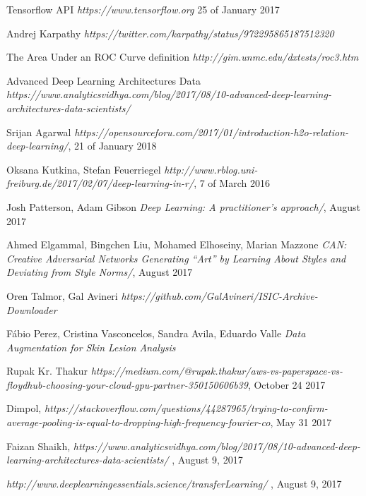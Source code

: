 \documentclass[titlepage,openright,twoside,a4paper,
final,12pt,english]{book}
\begin{document}
\begin{thebibliography}{9}
  Tensorflow API
{\em https://www.tensorflow.org} 25 of January 2017

  Andrej Karpathy 
{\em https://twitter.com/karpathy/status/972295865187512320}

 The Area Under an ROC Curve definition 
{\em http://gim.unmc.edu/dxtests/roc3.htm}

 Advanced Deep Learning Architectures Data
{\em https://www.analyticsvidhya.com/blog/2017/08/10-advanced-deep-learning-architectures-data-scientists/}

 
  Srijan Agarwal
{\em https://opensourceforu.com/2017/01/introduction-h2o-relation-deep-learning/}, 21 of January 2018
 
  Oksana Kutkina, Stefan Feuerriegel
{\em http://www.rblog.uni-freiburg.de/2017/02/07/deep-learning-in-r/}, 7 of March 2016 
 
  Josh Patterson, Adam Gibson
{\em Deep Learning: A practitioner's approach/}, August 2017

 Ahmed Elgammal, Bingchen Liu, Mohamed Elhoseiny, Marian Mazzone {\em CAN: Creative Adversarial Networks Generating “Art” by Learning About Styles and Deviating from Style Norms/}, August 2017

 Oren Talmor, Gal Avineri {\em https://github.com/GalAvineri/ISIC-Archive-Downloader}

 Fábio Perez, Cristina Vasconcelos, Sandra Avila, Eduardo Valle {\em Data Augmentation for Skin Lesion Analysis}


 Rupak Kr. Thakur {\em https://medium.com/@rupak.thakur/aws-vs-paperspace-vs-floydhub-choosing-your-cloud-gpu-partner-350150606b39}, October 24 2017

 Dimpol, {\em https://stackoverflow.com/questions/44287965/trying-to-confirm-average-pooling-is-equal-to-dropping-high-frequency-fourier-co}, May 31 2017

 Faizan Shaikh, {\em https://www.analyticsvidhya.com/blog/2017/08/10-advanced-deep-learning-architectures-data-scientists/
}, August 9, 2017


 {\em http://www.deeplearningessentials.science/transferLearning/
}, August 9, 2017

\end{thebibliography}
\end{document}
